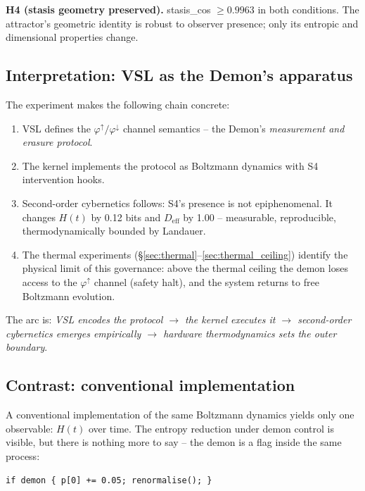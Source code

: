 \documentclass[11pt, a4paper]{article}
\begin{document}
\textbf{H4 (stasis geometry preserved).}  stasis\_cos $\geq 0.9963$ in both
conditions.  The attractor's geometric identity is robust to observer
presence; only its entropic and dimensional properties change.

\subsection{Interpretation: VSL as the Demon's apparatus}

The experiment makes the following chain concrete:

\begin{enumerate}
  \item VSL defines the $\varphi^\uparrow / \varphi^\downarrow$ channel
    semantics -- the Demon's \emph{measurement and erasure protocol}.
  \item The kernel implements the protocol as Boltzmann dynamics with
    S4 intervention hooks.
  \item Second-order cybernetics follows: S4's presence is not epiphenomenal.
    It changes $H(t)$ by 0.12 bits and $D_\text{eff}$ by 1.00 -- measurable,
    reproducible, thermodynamically bounded by Landauer.
  \item The thermal experiments (\S\ref{sec:thermal}--\ref{sec:thermal_ceiling})
    identify the physical limit of this governance: above the thermal ceiling
    the demon loses access to the $\varphi^\uparrow$ channel (safety halt),
    and the system returns to free Boltzmann evolution.
\end{enumerate}

The arc is: \emph{VSL encodes the protocol $\to$ the kernel executes it $\to$
second-order cybernetics emerges empirically $\to$ hardware thermodynamics sets
the outer boundary}.

\subsection{Contrast: conventional implementation}

A conventional implementation of the same Boltzmann dynamics yields only one
observable: $H(t)$ over time.
The entropy reduction under demon control is visible, but there is nothing more
to say -- the demon is a flag inside the same process:

\begin{center}
\texttt{if demon \{ p[0] += 0.05; renormalise(); \}}
\end{center}
\end{document}
